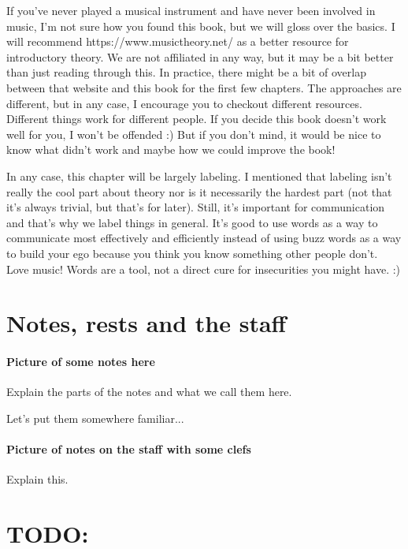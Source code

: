 \documentclass[../OpenAppliedMusicTheory.tex]{subfiles}
\begin{document}
    

    If you've never played a musical instrument and have never been involved in music, I'm not sure how you found this book, but we will gloss over the basics. I will recommend https://www.musictheory.net/ as a better resource for introductory theory. We are not affiliated in any way, but it may be a bit better than just reading through this. In practice, there might be a bit of overlap between that website and this book for the first few chapters. The approaches are different, but in any case, I encourage you to checkout different resources. Different things work for different people. If you decide this book doesn't work well for you, I won't be offended :) But if you don't mind, it would be nice to know what didn't work and maybe how we could improve the book!

    In any case, this chapter will be largely labeling. I mentioned that labeling isn't really the cool part about theory nor is it necessarily the hardest part (not that it's always trivial, but that's for later). Still, it's important for communication and that's why we label things in general. It's good to use words as a way to communicate most effectively and efficiently instead of using buzz words as a way to build your ego because you think you know something other people don't. Love music! Words are a tool, not a direct cure for insecurities you might have. :)

    \section{Notes, rests and the staff}\label{ch.1:notation}
        \paragraph{Picture of some notes here}
        Explain the parts of the notes and what we call them here.

        Let's put them somewhere familiar...
        \paragraph{Picture of notes on the staff with some clefs}
        Explain this.

    \section{TODO:}
\end{document}
